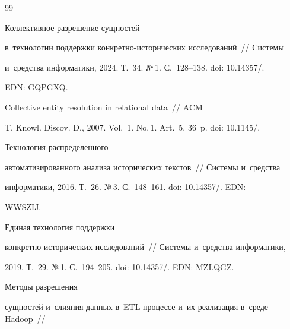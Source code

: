 {\small\frenchspacing


{%




\begin{thebibliography}{99}





\vspace{-3pt}







   Коллективное разрешение сущностей 


в~технологии поддержки кон\-крет\-но-ис\-то\-ри\-че\-ских исследований~/\!\!/ Сис\-те\-мы 


и~средства информатики, 2024. Т.~34. №\,1. С.~128--138.  doi: 10.14357\!/. 


EDN: GQPGXQ.




   Collective entity resolution in relational data~/\!\!/ ACM 


T. Knowl. Discov. D., 2007. Vol.~1. No.\,1. Art.~5. 36~p. doi: 10.1145\!/.




   Технология распределенного 


автоматизированного анализа исторических текс\-тов~/\!\!/ Сис\-те\-мы и~средства 


информатики, 2016. Т.~26. №\,3. С.~148--161. doi: 10.14357\!/. EDN: 


WWSZIJ.




   Единая технология поддержки  


кон\-крет\-но-ис\-то\-ри\-че\-ских исследований~/\!\!/ Сис\-те\-мы и~средства информатики, 


2019. Т.~29. №\,1. С.~194--205. doi: 10.14357\!/. EDN: MZLQGZ.




   Методы разрешения 


сущностей и~слияния данных в~ETL-про\-цес\-се и~их реализация в~среде Hadoop~/\!\!/ 



\end{thebibliography}}}

